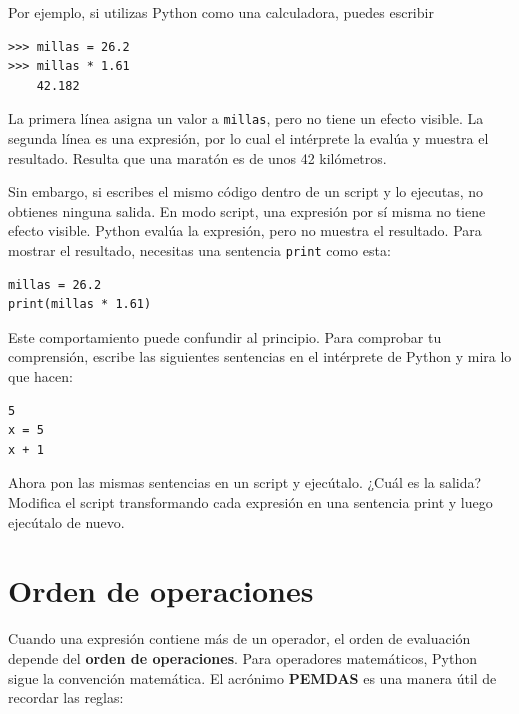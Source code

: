 \documentclass[10pt]{book}
\begin{document}
Por ejemplo, si utilizas Python como una calculadora, puedes escribir

\begin{verbatim}
>>> millas = 26.2
>>> millas * 1.61
    42.182
\end{verbatim}

La primera línea asigna un valor a {\tt millas}, pero no tiene un efecto
visible.  La segunda línea es una expresión, por lo cual el
intérprete la evalúa y muestra el resultado.  Resulta que una
maratón es de unos 42 kilómetros.

Sin embargo, si escribes el mismo código dentro de un script y lo ejecutas, no obtienes
ninguna salida.
En modo script, una expresión por sí misma no tiene
efecto visible.  Python evalúa la expresión, pero no
muestra el resultado.
Para mostrar el resultado, necesitas una sentencia {\tt print} como esta:

\begin{verbatim}
millas = 26.2
print(millas * 1.61)
\end{verbatim}

Este comportamiento puede confundir al principio.
Para comprobar tu comprensión, escribe las siguientes sentencias en el
intérprete de Python y mira lo que hacen:

\begin{verbatim}
5
x = 5
x + 1
\end{verbatim}

Ahora pon las mismas sentencias en un script y ejecútalo.  ¿Cuál
es la salida?  Modifica el script transformando cada
expresión en una sentencia print y luego ejecútalo de nuevo.

\section{Orden de operaciones}

Cuando una expresión contiene más de un operador, el orden de
evaluación depende del {\bf orden de operaciones}.  Para
operadores matemáticos, Python sigue la convención matemática.
El acrónimo {\bf PEMDAS} es una manera útil de
recordar las reglas:
\end{document}
